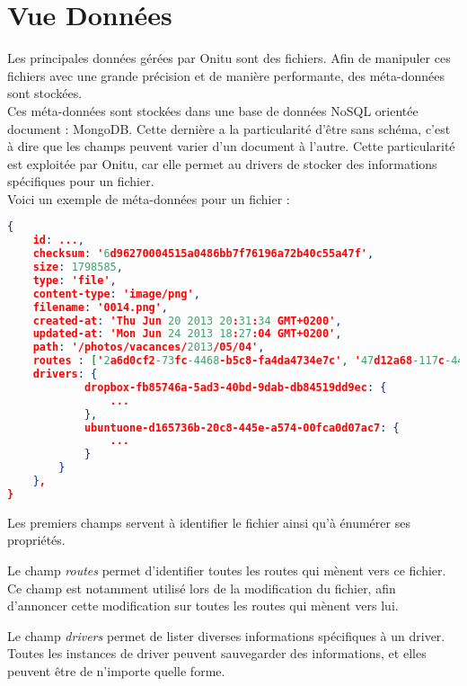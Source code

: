\chapter{Vue Données}
\thispagestyle{EIP} %

\vspace{-0.5cm} %
Les principales données gérées par Onitu sont des fichiers. Afin de manipuler ces fichiers avec une grande précision et de manière performante, des méta-données sont stockées.\\

Ces méta-données sont stockées dans une base de données NoSQL orientée document : MongoDB. Cette dernière a la particularité d'être sans schéma, c'est à dire que les champs peuvent varier d'un document à l'autre. Cette particularité est exploitée par Onitu, car elle permet au drivers de stocker des informations spécifiques pour un fichier.\\

Voici un exemple de méta-données pour un fichier :
\begin{lstlisting}[language=json,firstnumber=1]
{
    id: ...,
    checksum: '6d96270004515a0486bb7f76196a72b40c55a47f',
    size: 1798585,
    type: 'file',
    content-type: 'image/png',
    filename: '0014.png',
    created-at: 'Thu Jun 20 2013 20:31:34 GMT+0200',
    updated-at: 'Mon Jun 24 2013 18:27:04 GMT+0200',
    path: '/photos/vacances/2013/05/04',
    routes : ['2a6d0cf2-73fc-4468-b5c8-fa4da4734e7c', '47d12a68-117c-4410-8194-636f61c59281'],
    drivers: {
            dropbox-fb85746a-5ad3-40bd-9dab-db84519dd9ec: {
                ...
            },
            ubuntuone-d165736b-20c8-445e-a574-00fca0d07ac7: {
                ...
            }
        }
    },
}
\end{lstlisting}

Les premiers champs servent à identifier le fichier ainsi qu'à énumérer ses propriétés.

Le champ \textit{routes} permet d'identifier toutes les routes qui mènent vers ce fichier. Ce champ est notamment utilisé lors de la modification du fichier, afin d'annoncer cette modification sur toutes les routes qui mènent vers lui.

Le champ \textit{drivers} permet de lister diverses informations spécifiques à un driver. Toutes les instances de driver peuvent sauvegarder des informations, et elles peuvent être de n'importe quelle forme.
